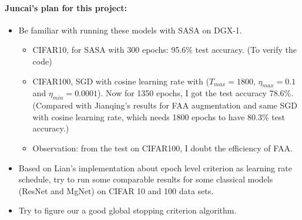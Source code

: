 \paragraph{Juncai's plan for this project:}
\begin{itemize}
	\item Be familiar with running these models with SASA on DGX-1.
	\begin{itemize}
	\item CIFAR10, for SASA with 300 epochs: 95.6\% test accuracy. (To verify the code)
	\item CIFAR100, SGD with cosine learning rate with ($T_{max}=1800$, $\eta_{max} = 0.1$ and $\eta_{min}=0.0001$). Now for 1350 epochs, I got the test accuracy 78.6\%. (Compared with Jianqing's results for FAA augmentation and same SGD with cosine learning rate, which needs 1800 epochs to have 80.3\% test accuracy.)
	\item Observation: from the test on CIFAR100, I doubt the efficiency of FAA. 
	\end{itemize}
	\item Based on Lian's implementation about epoch level criterion as learning rate schedule, try to run some comparable results for some classical models (ResNet and MgNet) on CIFAR 10 and 100 data sets. 
	\item Try to figure our a good global stopping criterion algorithm.
\end{itemize}

